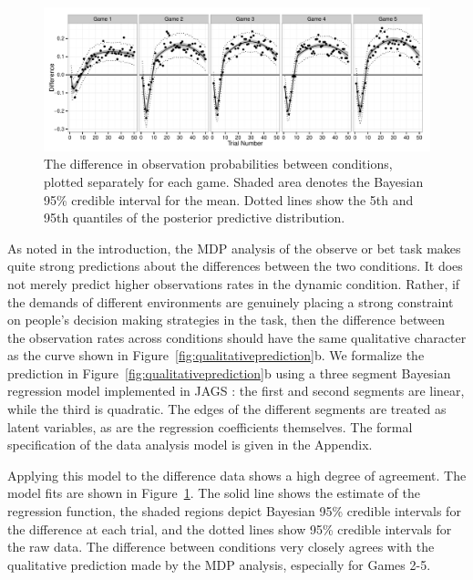 \documentclass[authoryear]{elsarticle}
\begin{document}
\begin{figure}[p]
\begin{center}
\includegraphics[scale=.6]{diffByGame.pdf}
\caption{The difference in observation probabilities between conditions, plotted separately for each game. Shaded area denotes the Bayesian 95\% credible interval for the mean. Dotted lines show the 5th and 95th quantiles of the posterior predictive distribution.}
\label{fig:diffByGame}
\end{center}
\end{figure}



As noted in the introduction, the MDP analysis of the observe or bet task makes quite strong predictions about the differences between the two conditions. It does not merely predict higher observations rates in the dynamic condition. Rather, if the demands of different environments are genuinely placing a strong constraint on people's decision making strategies in the task, then the difference between the observation rates across conditions should have the same qualitative character as the curve shown in Figure~\ref{fig:qualitativeprediction}b. We formalize the prediction in Figure~\ref{fig:qualitativeprediction}b using a three segment Bayesian regression model implemented in JAGS \citep{plummer_jags:_2003}: the first and second segments are linear, while the third is quadratic. The edges of the different segments are treated as latent variables, as are the regression coefficients themselves. The formal specification of the data analysis model is given in the Appendix.

Applying this model to the difference data shows a high degree of agreement. The model fits are shown in Figure~\ref{fig:diffByGame}. The solid line shows the estimate of the regression function, the shaded regions depict Bayesian 95\% credible intervals for the difference at each trial, and the dotted lines show 95\% credible intervals for the raw data. The difference between conditions very closely agrees with the qualitative prediction made by the MDP analysis, especially for Games 2-5.
\end{document}
